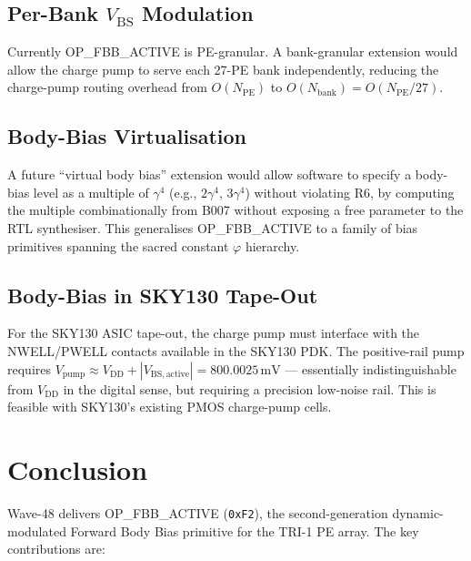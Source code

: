 \documentclass[12pt,a4paper]{report}
\theoremstyle{plain}
\theoremstyle{definition}
\theoremstyle{remark}
\newcommand{\opcode}[1]{\texttt{#1}}
\newcommand{\vbs}{V_{\mathrm{BS,active}}}
\newcommand{\vdd}{V_{\mathrm{DD}}}
\newcommand{\gammaFour}{\gamma^{4}}
\begin{document}
\subsection{Per-Bank $V_{\mathrm{BS}}$ Modulation}

Currently OP\_FBB\_ACTIVE is PE-granular.  A bank-granular extension would allow the charge
pump to serve each 27-PE bank independently, reducing the charge-pump routing overhead from
$O(N_{\mathrm{PE}})$ to $O(N_{\mathrm{bank}}) = O(N_{\mathrm{PE}}/27)$.

\subsection{Body-Bias Virtualisation}

A future ``virtual body bias'' extension would allow software to specify a body-bias level as
a multiple of $\gammaFour$ (e.g., $2\gammaFour$, $3\gammaFour$) without violating R6, by
computing the multiple combinationally from B007 without exposing a free parameter to the RTL
synthesiser.  This generalises OP\_FBB\_ACTIVE to a family of bias primitives spanning the
sacred constant $\varphi$ hierarchy.

\subsection{Body-Bias in SKY130 Tape-Out}

For the SKY130 ASIC tape-out, the charge pump must interface with the NWELL/PWELL contacts
available in the SKY130 PDK.  The positive-rail pump requires $V_{\mathrm{pump}} \approx
V_{\mathrm{DD}} + |\vbs| = 800.0025\,\mathrm{mV}$ — essentially indistinguishable from $\vdd$
in the digital sense, but requiring a precision low-noise rail.  This is feasible with SKY130's
existing PMOS charge-pump cells.

\section{Conclusion}
\label{sec:conclusion}

Wave-48 delivers OP\_FBB\_ACTIVE (\opcode{0xF2}), the second-generation dynamic-modulated Forward
Body Bias primitive for the TRI-1 PE array.  The key contributions are:
\end{document}
